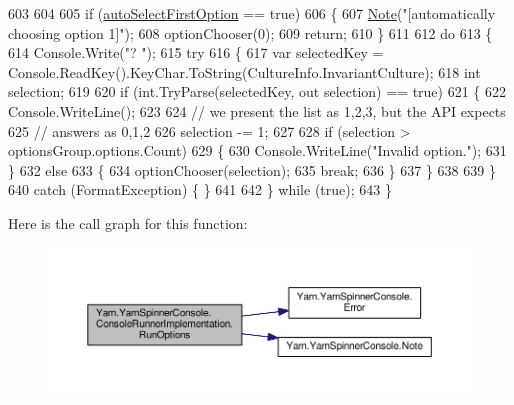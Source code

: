 \begin{DoxyCode}
603 
604 
605                 \textcolor{keywordflow}{if} (\hyperlink{a00058_a09a552ee9ff58cb3c995f8ecba1592b6}{autoSelectFirstOption} == \textcolor{keyword}{true})
606                 \{
607                     \hyperlink{a00197_a939cc9e943c574b36c6af93e9c772702}{Note}(\textcolor{stringliteral}{"[automatically choosing option 1]"});
608                     optionChooser(0);
609                     \textcolor{keywordflow}{return};
610                 \}
611 
612                 \textcolor{keywordflow}{do}
613                 \{
614                     Console.Write(\textcolor{stringliteral}{"? "});
615                     \textcolor{keywordflow}{try}
616                     \{
617                         var selectedKey = Console.ReadKey().KeyChar.ToString(CultureInfo.InvariantCulture);
618                         \textcolor{keywordtype}{int} selection;
619 
620                         \textcolor{keywordflow}{if} (\textcolor{keywordtype}{int}.TryParse(selectedKey, out selection) == \textcolor{keyword}{true})
621                         \{
622                             Console.WriteLine();
623 
624                             \textcolor{comment}{// we present the list as 1,2,3, but the API expects}
625                             \textcolor{comment}{// answers as 0,1,2}
626                             selection -= 1;
627 
628                             \textcolor{keywordflow}{if} (selection > optionsGroup.options.Count)
629                             \{
630                                 Console.WriteLine(\textcolor{stringliteral}{"Invalid option."});
631                             \}
632                             \textcolor{keywordflow}{else}
633                             \{
634                                 optionChooser(selection);
635                                 \textcolor{keywordflow}{break};
636                             \}
637                         \}
638 
639                     \}
640                     \textcolor{keywordflow}{catch} (FormatException) \{ \}
641 
642                 \} \textcolor{keywordflow}{while} (\textcolor{keyword}{true});
643             \}
\end{DoxyCode}


Here is the call graph for this function\-:
\nopagebreak
\begin{figure}[H]
\begin{center}
\leavevmode
\includegraphics[width=350pt]{a00058_a62674694fa65e5ae8c0c0da4fbceda51_cgraph}
\end{center}
\end{figure}


